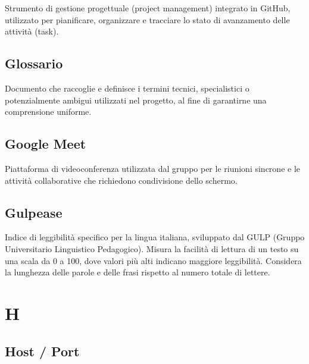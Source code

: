 \documentclass[a4paper, 11pt, oneside]{scrartcl} %
\begin{document}

Strumento di gestione progettuale (project management) integrato in GitHub, utilizzato per pianificare, organizzare e tracciare lo stato di avanzamento delle attività (task).

\vspace{0.5cm}

\subsection*{Glossario}


Documento che raccoglie e definisce i termini tecnici, specialistici o potenzialmente ambigui utilizzati nel progetto, al fine di garantirne una comprensione uniforme.

\vspace{0.5cm}

\subsection*{Google Meet}


Piattaforma di videoconferenza utilizzata dal gruppo per le riunioni sincrone e le attività collaborative che richiedono condivisione dello schermo.

\vspace{0.5cm}

\subsection*{Gulpease}
Indice di leggibilità specifico per la lingua italiana, sviluppato dal GULP (Gruppo Universitario Linguistico Pedagogico). Misura la facilità di lettura di un testo su una scala da 0 a 100, dove valori più alti indicano maggiore leggibilità. Considera la lunghezza delle parole e delle frasi rispetto al numero totale di lettere.
\vspace{0.5cm}

\section*{H}

\subsection*{Host / Port}
\end{document}
